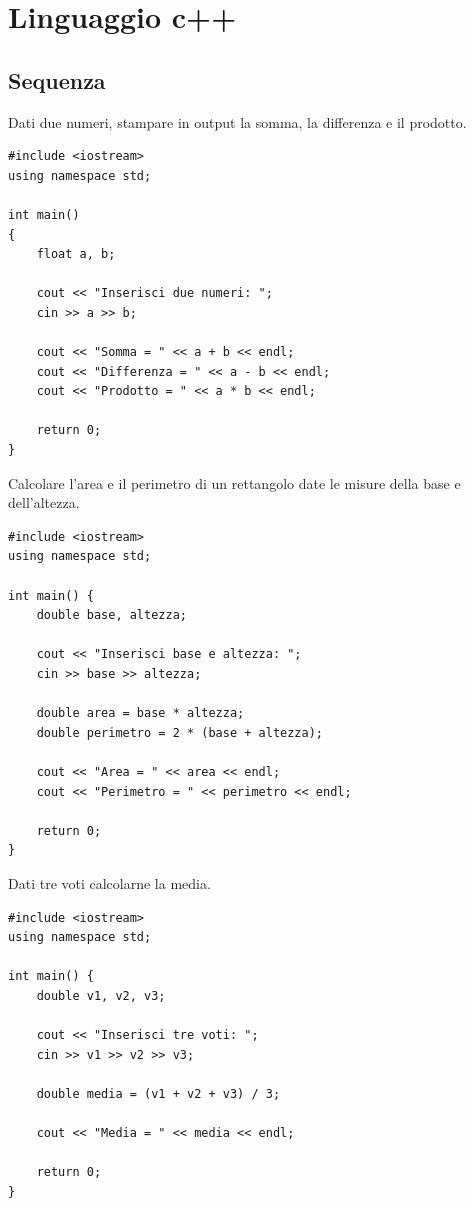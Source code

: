 \documentclass[11pt,fleqn]{book}
\begin{document}

\chapter{Linguaggio c++}

\section{Sequenza}

\begin{esercizio}[1]
    Dati due numeri, stampare in output la somma, la differenza e il prodotto.
    \ifsoluzioni
    \solution
    \begin{lstlisting}[style=cpp]
#include <iostream>
using namespace std;

int main() 
{
    float a, b;

    cout << "Inserisci due numeri: ";
    cin >> a >> b;

    cout << "Somma = " << a + b << endl;
    cout << "Differenza = " << a - b << endl;
    cout << "Prodotto = " << a * b << endl;

    return 0;
}
    \end{lstlisting}
    \fi
\end{esercizio}

\begin{esercizio}[1]
    Calcolare l'area e il perimetro di un rettangolo date le misure della base e dell'altezza.
    \ifsoluzioni
    \solution
    \begin{lstlisting}[style=cpp]
#include <iostream>
using namespace std;

int main() {
    double base, altezza;

    cout << "Inserisci base e altezza: ";
    cin >> base >> altezza;

    double area = base * altezza;
    double perimetro = 2 * (base + altezza);

    cout << "Area = " << area << endl;
    cout << "Perimetro = " << perimetro << endl;

    return 0;
}
    \end{lstlisting}
    \fi
\end{esercizio}

\begin{esercizio}[1]
    Dati tre voti calcolarne la media.
    \ifsoluzioni
    \solution
    \begin{lstlisting}[style=cpp]
#include <iostream>
using namespace std;

int main() {
    double v1, v2, v3;

    cout << "Inserisci tre voti: ";
    cin >> v1 >> v2 >> v3;

    double media = (v1 + v2 + v3) / 3;

    cout << "Media = " << media << endl;

    return 0;
}
    \end{lstlisting}
    \fi
\end{esercizio}
\end{document}
